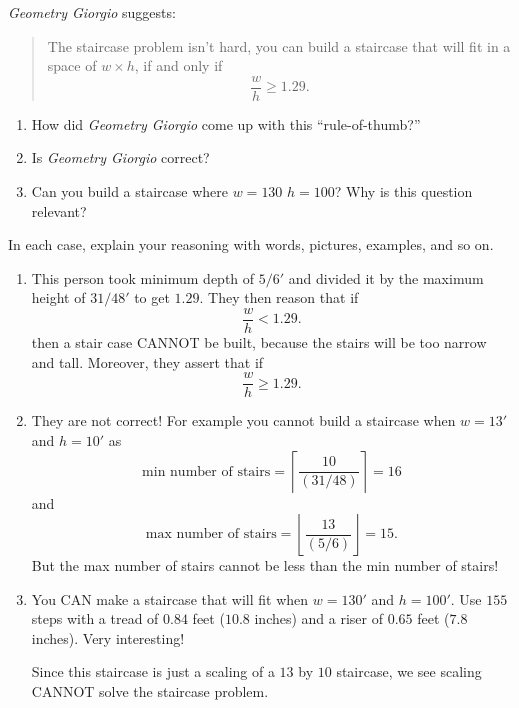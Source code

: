 \documentclass[noauthor,nooutcomes,handout]{ximera}
\begin{document}
\begin{question}
  \textit{Geometry Giorgio} suggests:
  \begin{quote}
    The staircase problem isn't hard, you can build a staircase that
    will fit in a space of $w\times h$, if and only if
    \[
    \frac{w}{h} \ge 1.29.
    \]
  \end{quote}
  \begin{enumerate}
    \item How did \textit{Geometry Giorgio} come up with this ``rule-of-thumb?''
    \item Is \textit{Geometry Giorgio} correct?
    \item Can you build a staircase where $w=130$ $h=100$? Why is this question relevant?
  \end{enumerate}
  In each case, explain your reasoning with words, pictures, examples, and so on.
  \begin{freeResponse}
    \begin{enumerate}
    \item This person took minimum depth of $5/6'$ and divided it by
      the maximum height of $31/48'$ to get $1.29$. They then reason that if
      \[
      \frac{w}{h} <1.29.
      \]
      then a stair case CANNOT be built, because the stairs will be
      too narrow and tall. Moreover, they assert that if
      \[
      \frac{w}{h} \ge 1.29.
      \]
    \item They are not correct! For example you cannot build a
      staircase when $w=13'$ and $h=10'$ as
      \[
      \text{min number of stairs} = \left\lceil
      \frac{10}{\left(31/48\right)} \right\rceil=16
      \]
      and
      \[
      \text{max number of stairs} = \left\lfloor
      \frac{13}{\left(5/6\right)} \right\rfloor=15.
      \]
      But the max number of stairs cannot be less than the min number of stairs!
    \item You CAN make a staircase that will fit when $w=130'$ and
      $h=100'$. Use $155$ steps with a tread of $0.84$ feet ($10.8$
      inches) and a riser of $0.65$ feet ($7.8$ inches). Very interesting!


      
      Since this staircase is just a scaling of a $13$ by $10$
      staircase, we see scaling CANNOT solve the staircase problem.
    \end{enumerate}
  \end{freeResponse}
\end{question}
\end{document}
